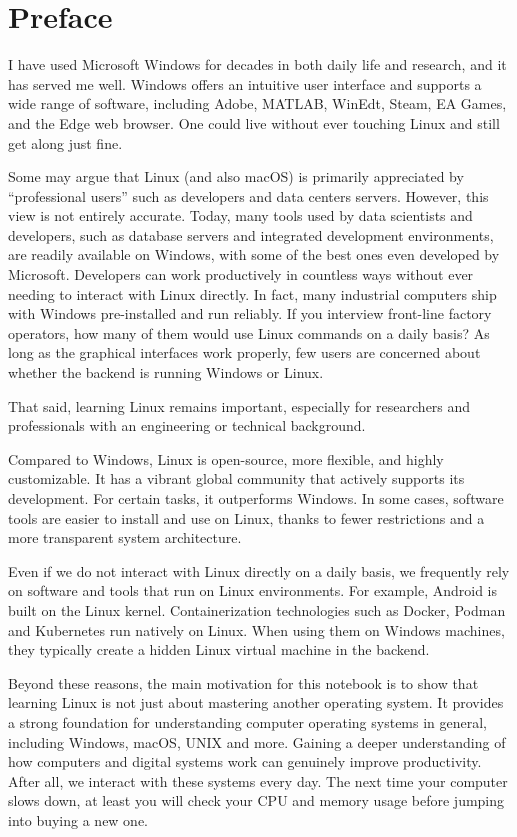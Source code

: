 \chapter*{Preface}

I have used Microsoft Windows for decades in both daily life and research, and it has served me well. Windows offers an intuitive user interface and supports a wide range of software, including Adobe, MATLAB, WinEdt, Steam, EA Games, and the Edge web browser. One could live without ever touching Linux and still get along just fine.

Some may argue that Linux (and also macOS) is primarily appreciated by ``professional users'' such as developers and data centers servers. However, this view is not entirely accurate. Today, many tools used by data scientists and developers, such as database servers and integrated development environments, are readily available on Windows, with some of the best ones even developed by Microsoft. Developers can work productively in countless ways without ever needing to interact with Linux directly. In fact, many industrial computers ship with Windows pre-installed and run reliably. If you interview front-line factory operators, how many of them would use Linux commands on a daily basis? As long as the graphical interfaces work properly, few users are concerned about whether the backend is running Windows or Linux.

That said, learning Linux remains important, especially for researchers and professionals with an engineering or technical background.

Compared to Windows, Linux is open-source, more flexible, and highly customizable. It has a vibrant global community that actively supports its development. For certain tasks, it outperforms Windows. In some cases, software tools are easier to install and use on Linux, thanks to fewer restrictions and a more transparent system architecture.

Even if we do not interact with Linux directly on a daily basis, we frequently rely on software and tools that run on Linux environments. For example, Android is built on the Linux kernel. Containerization technologies such as Docker, Podman and Kubernetes run natively on Linux. When using them on Windows machines, they typically create a hidden Linux virtual machine in the backend.

Beyond these reasons, the main motivation for this notebook is to show that learning Linux is not just about mastering another operating system. It provides a strong foundation for understanding computer operating systems in general, including Windows, macOS, UNIX and more. Gaining a deeper understanding of how computers and digital systems work can genuinely improve productivity. After all, we interact with these systems every day. The next time your computer slows down, at least you will check your CPU and memory usage before jumping into buying a new one.

